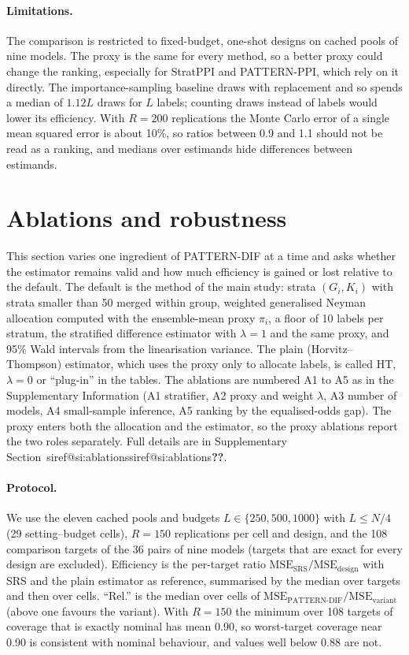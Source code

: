 \documentclass[pdflatex,sn-mathphys-num,iicol]{sn-jnl}
\makeatletter
\theoremstyle{thmstyleone}
\theoremstyle{thmstyletwo}
\theoremstyle{thmstylethree}
\newcommand{\SIref}[1]{\ifcsname siref@#1\endcsname\csname siref@#1\endcsname\else\textbf{??}\fi}
\makeatother
\begin{document}
\paragraph{Limitations.} The comparison is restricted to fixed-budget, one-shot designs on cached pools of nine models. The proxy is the same for every method, so a better proxy could change the ranking, especially for StratPPI and PATTERN-PPI, which rely on it directly. The importance-sampling baseline draws with replacement and so spends a median of $1.12L$ draws for $L$ labels; counting draws instead of labels would lower its efficiency. With $R=200$ replications the Monte Carlo error of a single mean squared error is about 10\%, so ratios between 0.9 and 1.1 should not be read as a ranking, and medians over estimands hide differences between estimands.

\section{Ablations and robustness}
\label{sec:ablations}

This section varies one ingredient of PATTERN-DIF at a time and asks whether the estimator remains valid and how much efficiency is gained or lost relative to the default. The default is the method of the main study: strata $(G_i,K_i)$ with strata smaller than 50 merged within group, weighted generalised Neyman allocation \citep{neyman1934} computed with the ensemble-mean proxy $\pi_i$, a floor of 10 labels per stratum, the stratified difference estimator with $\lambda=1$ and the same proxy, and 95\% Wald intervals from the linearisation variance. The plain (Horvitz--Thompson) estimator, which uses the proxy only to allocate labels, is called HT, $\lambda=0$ or ``plug-in'' in the tables. The ablations are numbered A1 to A5 as in the Supplementary Information (A1 stratifier, A2 proxy and weight $\lambda$, A3 number of models, A4 small-sample inference, A5 ranking by the equalised-odds gap). The proxy enters both the allocation and the estimator, so the proxy ablations report the two roles separately. Full details are in Supplementary Section~\SIref{si:ablations}.

\paragraph{Protocol.} We use the eleven cached pools and budgets $L\in\{250,500,1000\}$ with $L\le N/4$ (29 setting--budget cells), $R=150$ replications per cell and design, and the 108 comparison targets of the 36 pairs of nine models (targets that are exact for every design are excluded). Efficiency is the per-target ratio $\mathrm{MSE}_{\mathrm{SRS}}/\mathrm{MSE}_{\mathrm{design}}$ with SRS and the plain estimator as reference, summarised by the median over targets and then over cells. ``Rel.'' is the median over cells of $\mathrm{MSE}_{\mathrm{PATTERN\text{-}DIF}}/\mathrm{MSE}_{\mathrm{variant}}$ (above one favours the variant). With $R=150$ the minimum over 108 targets of coverage that is exactly nominal has mean 0.90, so worst-target coverage near 0.90 is consistent with nominal behaviour, and values well below 0.88 are not.
\end{document}
